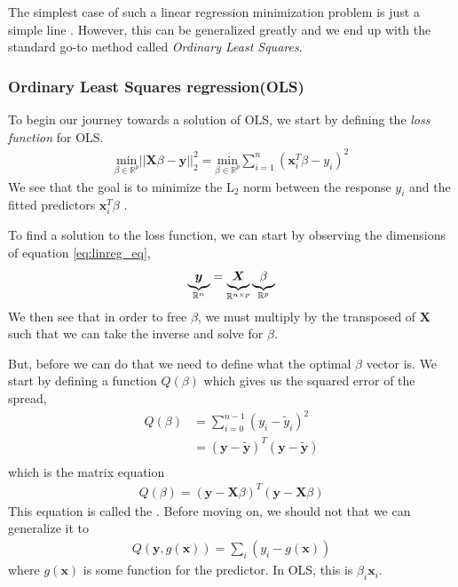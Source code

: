 \documentclass[11pt]{article}
\begin{document}
The simplest case of such a linear regression minimization problem is just a simple line \citep[ch. 3.1, p. 61]{james2013introduction}. However, this can be generalized greatly and we end up with the standard go-to method called \textit{Ordinary Least Squares}.

\subsubsection{Ordinary Least Squares regression(OLS)}
To begin our journey towards a solution of OLS, we start by defining the \textit{loss function} for OLS. 
\begin{align}
    \underset{\beta\in \mathbb{R}^{p}}{\text{min}}||\bm{X}\beta - \bm{y}||^2_2 = 
    \underset{\beta\in \mathbb{R}^{p}}{\text{min}}\sum^n_{i=1}\left(\bm{x}^T_i\beta - y_i\right)^2
    \label{eq:ols_constraint}
\end{align}
We see that the goal is to minimize the L$_2$ norm between the response $y_i$ and the fitted predictors $\bm{x}_i^T\beta$ \citep[ch. 4, p. 21]{2018arXiv180308823M}.

To find a solution to the loss function, we can start by observing the dimensions of equation \eqref{eq:linreg_eq},
\begin{align}
    \underbrace{\vphantom{\beta}\bm{y}}_{\mathbb{R}^{n}} = \underbrace{\vphantom{\beta}\bm{X}}_{\mathbb{R}^{n\times p}} \underbrace{\beta}_{\mathbb{R}^{p}}
    \label{eq:matrix_eq_solution}
\end{align}
We then see that in order to free $\beta$, we must multiply by the transposed of $\bm{X}$ such that we can take the inverse and solve for $\beta$.

But, before we can do that we need to define what the optimal $\beta$ vector is. We start by defining a function $Q(\beta)$ which gives us the squared error of the spread,
\begin{align*}
    Q(\beta) &= \sum^{n-1}_{i=0} (y_i - \tilde{y}_i)^2 \\
    &= (\bm{y} - \tilde{\bm{y}})^T (\bm{y} - \tilde{\bm{y}}) \\
\end{align*}
which is the matrix equation
\begin{align}
    Q(\beta) = (\bm{y} - \bm{X}\beta)^T (\bm{y} - \bm{X}\beta)
    \label{eq:ols_cost_function}
\end{align}
This equation is called the  \citep[p. 12]{2018arXiv180308823M}. Before moving on, we should not that we can generalize it to
\begin{align}
    Q(\bm{y}, g(\bm{x})) = \sum_i \left(y_i - g(\bm{x}) \right)
    \label{eq:reg_cost_func}
\end{align}
where $g(\bm{x})$ is some function for the predictor. In OLS, this is $\beta_i \bm{x}_i$.
\end{document}
